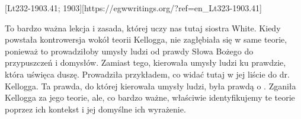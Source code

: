 [Lt232-1903.41; 1903][https://egwwritings.org/?ref=en\_Lt323-1903.41]

To bardzo ważna lekcja i zasada, której uczy nas tutaj siostra White. Kiedy powstała kontrowersja wokół teorii Kellogga, nie zagłębiała się w same teorie, ponieważ to prowadziłoby umysły ludzi od prawdy Słowa Bożego do przypuszczeń i domysłów. Zamiast tego, kierowała umysły ludzi ku prawdzie, która uświęca duszę. Prowadziła przykładem, co widać tutaj w jej liście do dr. Kellogga. Ta prawda, do której kierowała umysły ludzi, była prawdą o . Zganiła Kellogga za jego teorie, ale, co bardzo ważne, właściwie identyfikujemy te teorie poprzez ich kontekst i jej domyślne ich wyrażenie.

